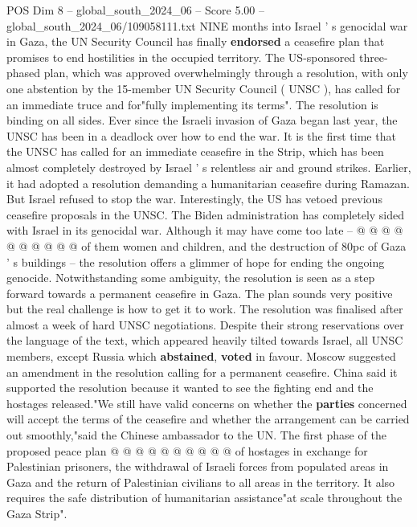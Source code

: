 \begin{textsample}{POS Dim 8 – global\_south\_2024\_06 – Score 5.00 – global\_south\_2024\_06/109058111.txt}  \label{ex:f8_pos_217}
NINE months into Israel ' s genocidal war in Gaza, the UN Security Council has finally \textbf{endorsed} a ceasefire plan that promises to end hostilities in the occupied territory.
The US-sponsored three-phased plan, which was approved overwhelmingly through a resolution, with only one abstention by the 15-member UN Security Council ( UNSC ), has called for an immediate truce and for"fully implementing its terms".
The resolution is binding on all sides.
Ever since the Israeli invasion of Gaza began last year, the UNSC has been in a deadlock over how to end the war.
It is the first time that the UNSC has called for an immediate ceasefire in the Strip, which has been almost completely destroyed by Israel ' s relentless air and ground strikes.
Earlier, it had adopted a resolution demanding a humanitarian ceasefire during Ramazan.
But Israel refused to stop the war.
Interestingly, the US has vetoed previous ceasefire proposals in the UNSC.
The Biden administration has completely sided with Israel in its genocidal war.
Although it may have come too late -- @ @ @ @ @ @ @ @ @ @ of them women and children, and the destruction of 80pc of Gaza ' s buildings -- the resolution offers a glimmer of hope for ending the ongoing genocide.
Notwithstanding some ambiguity, the resolution is seen as a step forward towards a permanent ceasefire in Gaza.
The plan sounds very positive but the real challenge is how to get it to work.
The resolution was finalised after almost a week of hard UNSC negotiations.
Despite their strong reservations over the language of the text, which appeared heavily tilted towards Israel, all UNSC members, except Russia which \textbf{abstained}, \textbf{voted} in favour.
Moscow suggested an amendment in the resolution calling for a permanent ceasefire.
China said it supported the resolution because it wanted to see the fighting end and the hostages released."We still have valid concerns on whether the \textbf{parties} concerned will accept the terms of the ceasefire and whether the arrangement can be carried out smoothly,"said the Chinese ambassador to the UN.
The first phase of the proposed peace plan @ @ @ @ @ @ @ @ @ @ of hostages in exchange for Palestinian prisoners, the withdrawal of Israeli forces from populated areas in Gaza and the return of Palestinian civilians to all areas in the territory.
It also requires the safe distribution of humanitarian assistance"at scale throughout the Gaza Strip".

\end{textsample}
